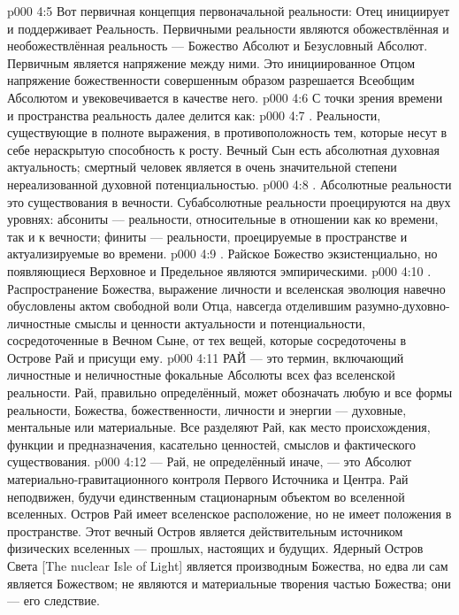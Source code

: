 \vs p000 4:5 Вот первичная концепция первоначальной реальности: Отец инициирует и поддерживает Реальность. Первичными  реальности являются обожествлённая и необожествлённая реальность --- Божество Абсолют и Безусловный Абсолют. Первичным  является напряжение между ними. Это инициированное Отцом напряжение божественности совершенным образом разрешается Всеобщим Абсолютом и увековечивается в качестве него.
\vs p000 4:6 \pc С точки зрения времени и пространства реальность далее делится как:
\vs p000 4:7 \bibnobreakspace {}. Реальности, существующие в полноте выражения, в противоположность тем, которые несут в себе нераскрытую способность к росту. Вечный Сын есть абсолютная духовная актуальность; смертный человек является в очень значительной степени нереализованной духовной потенциальностью.
\vs p000 4:8 \bibnobreakspace {}. Абсолютные реальности это существования в вечности. Субабсолютные реальности проецируются на двух уровнях: абсониты --- реальности, относительные в отношении как ко времени, так и к вечности; финиты --- реальности, проецируемые в пространстве и актуализируемые во времени.
\vs p000 4:9 \bibnobreakspace {}. Райское Божество экзистенциально, но появляющиеся Верховное и Предельное являются эмпирическими.
\vs p000 4:10 \bibnobreakspace {}. Распространение Божества, выражение личности и вселенская эволюция навечно обусловлены актом свободной воли Отца, навсегда отделившим разумно\hyp{}духовно\hyp{}личностные смыслы и ценности актуальности и потенциальности, сосредоточенные в Вечном Сыне, от тех вещей, которые сосредоточены в Острове Рай и присущи ему.
\vs p000 4:11 \pc РАЙ --- это термин, включающий личностные и неличностные фокальные Абсолюты всех фаз вселенской реальности. Рай, правильно определённый, может обозначать любую и все формы реальности, Божества, божественности, личности и энергии --- духовные, ментальные или материальные. Все разделяют Рай, как место происхождения, функции и предназначения, касательно ценностей, смыслов и фактического существования.
\vs p000 4:12 \pc {} --- Рай, не определённый иначе, --- это Абсолют материально\hyp{}гравитационного контроля Первого Источника и Центра. Рай неподвижен, будучи единственным стационарным объектом во вселенной вселенных. Остров Рай имеет вселенское расположение, но не имеет положения в пространстве. Этот вечный Остров является действительным источником физических вселенных --- прошлых, настоящих и будущих. Ядерный Остров Света [The nuclear Isle of Light] является производным Божества, но едва ли сам является Божеством; не являются и материальные творения частью Божества; они --- его следствие.
